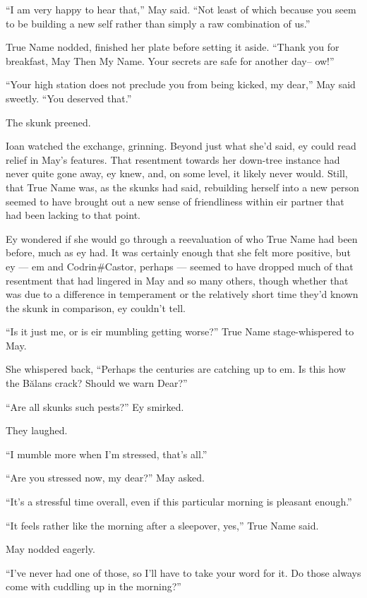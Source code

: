 ``I am very happy to hear that,'' May said. ``Not least of which because you seem to be building a new self rather than simply a raw combination of us.''

True Name nodded, finished her plate before setting it aside. ``Thank you for breakfast, May Then My Name. Your secrets are safe for another day-- ow!''

``Your high station does not preclude you from being kicked, my dear,'' May said sweetly. ``You deserved that.''

The skunk preened.

Ioan watched the exchange, grinning. Beyond just what she'd said, ey could read relief in May's features. That resentment towards her down-tree instance had never quite gone away, ey knew, and, on some level, it likely never would. Still, that True Name was, as the skunks had said, rebuilding herself into a new person seemed to have brought out a new sense of friendliness within eir partner that had been lacking to that point.

Ey wondered if she would go through a reevaluation of who True Name had been before, much as ey had. It was certainly enough that she felt more positive, but ey — em and Codrin\#Castor, perhaps — seemed to have dropped much of that resentment that had lingered in May and so many others, though whether that was due to a difference in temperament or the relatively short time they'd known the skunk in comparison, ey couldn't tell.

``Is it just me, or is eir mumbling getting worse?'' True Name stage-whispered to May.

She whispered back, ``Perhaps the centuries are catching up to em. Is this how the Bălans crack? Should we warn Dear?''

``Are all skunks such pests?'' Ey smirked.

They laughed.

``I mumble more when I'm stressed, that's all.''

``Are you stressed now, my dear?'' May asked.

``It's a stressful time overall, even if this particular morning is pleasant enough.''

``It feels rather like the morning after a sleepover, yes,'' True Name said.

May nodded eagerly.

``I've never had one of those, so I'll have to take your word for it. Do those always come with cuddling up in the morning?''

